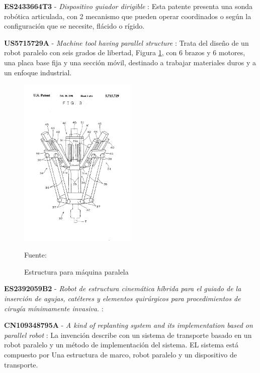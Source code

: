 \textbf{ES2433664T3} - \textit{Dispositivo guiador dirigible} \citep{patent:ES2433664T3}: Esta patente presenta una sonda robótica articulada, con 2 mecanismo que pueden operar coordinados o según la configuración que se necesite, flácido o rígido.

\textbf{US5715729A} - \textit{Machine tool having parallel structure} \citep{patent:US5715729A}: Trata del diseño de un robot paralelo con seis grados de libertad, Figura \ref{fig:US5715729A}, con 6 brazos y 6 motores, una placa base fija y una sección móvil, destinado a trabajar materiales duros y a un enfoque industrial.

\begin{figure}[ht]
    \centering
    \includegraphics[width = 0.5\textwidth ]{Cap2_DisenoEspecificaciones/Figura/US5715729A.pdf}
    \caption{Estructura para máquina paralela}{Fuente:\citep{patent:US5715729A}}
    \label{fig:US5715729A}
\end{figure}

\textbf{ES2392059B2} - \textit{Robot de estructura cinemática híbrida para el guiado de la inserción de agujas, catéteres y elementos quirúrgicos para procedimientos de cirugía mínimamente invasiva.} \citep{patent:ES2392059B2}: 

\textbf{CN109348795A} - \textit{A kind of replanting system and its implementation based on parallel robot} \citep{patent:CN109348795A}: La invención describe con un sistema de transporte basado en un robot paralelo y un método de implementación del sistema. EL sistema está compuesto por Una estructura de marco, robot paralelo y un dispositivo de transporte.

